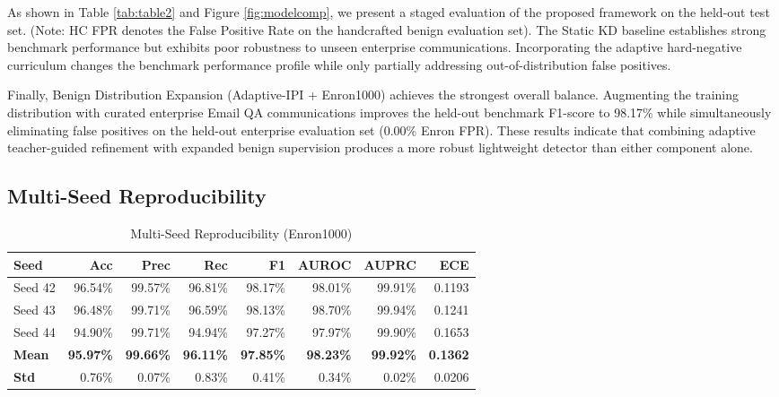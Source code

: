 \documentclass[conference]{IEEEtran}
\begin{document}
As shown in Table \ref{tab:table2} and Figure \ref{fig:modelcomp}, we present a staged evaluation of
the proposed framework on the held-out test set. (Note: HC FPR denotes the False Positive Rate on
the handcrafted benign evaluation set). The Static KD baseline establishes strong benchmark
performance but exhibits poor robustness to unseen enterprise communications. Incorporating the
adaptive hard-negative curriculum changes the benchmark performance profile while only partially
addressing out-of-distribution false positives.

Finally, Benign Distribution Expansion (Adaptive-IPI + Enron1000) achieves the strongest overall
balance. Augmenting the training distribution with curated enterprise Email QA communications
improves the held-out benchmark F1-score to 98.17\% while simultaneously eliminating false positives
on the held-out enterprise evaluation set (0.00\% Enron FPR). These results indicate that combining
adaptive teacher-guided refinement with expanded benign supervision produces a more robust
lightweight detector than either component alone.

\subsection{Multi-Seed Reproducibility}

\begin{table}[tb]
\centering
\caption{Multi-Seed Reproducibility (Enron1000)}
\label{tab:table3}
\renewcommand{\arraystretch}{1.15}
\setlength{\tabcolsep}{2.2pt}
\footnotesize
\begin{tabular}{lrrrrrrr}
\toprule
\textbf{Seed} & \textbf{Acc} & \textbf{Prec} & \textbf{Rec} & \textbf{F1} & \textbf{AUROC} & \textbf{AUPRC} & \textbf{ECE} \\
\midrule
Seed 42 & 96.54\% & 99.57\% & 96.81\% & 98.17\% & 98.01\% & 99.91\% & 0.1193 \\
Seed 43 & 96.48\% & 99.71\% & 96.59\% & 98.13\% & 98.70\% & 99.94\% & 0.1241 \\
Seed 44 & 94.90\% & 99.71\% & 94.94\% & 97.27\% & 97.97\% & 99.90\% & 0.1653 \\
\textbf{Mean} & \textbf{95.97\%} & \textbf{99.66\%} & \textbf{96.11\%} & \textbf{97.85\%} & \textbf{98.23\%} & \textbf{99.92\%} & \textbf{0.1362} \\
\textbf{Std} & 0.76\% & 0.07\% & 0.83\% & 0.41\% & 0.34\% & 0.02\% & 0.0206 \\
\bottomrule
\end{tabular}
\end{table}
\FloatBarrier
\end{document}
